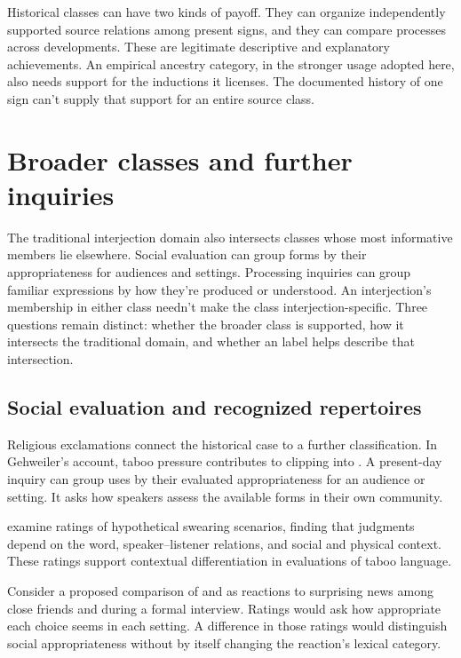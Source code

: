 \documentclass[12pt]{article}
\begin{document}
Historical classes can have two kinds of payoff. They can
organize independently supported source relations among present signs,
and they can compare processes across developments. These are legitimate
descriptive and explanatory achievements. An empirical ancestry category,
in the stronger usage adopted here, also needs support for the
inductions it licenses. The documented history of one sign can't supply
that support for an entire source class.

\section{Broader classes and further inquiries}\label{sec:extensions}

The traditional interjection domain also intersects classes whose most
informative members lie elsewhere. Social evaluation can group forms
by their appropriateness for audiences and settings. Processing inquiries
can group familiar expressions by how they're produced or understood.
An interjection's membership in either class needn't make the class
interjection-specific. Three questions remain distinct: whether the
broader class is supported, how it intersects the traditional domain,
and whether an  label helps describe that intersection.

\subsection{Social evaluation and recognized repertoires}

Religious exclamations connect the historical case to a further classification.
In Gehweiler's account, taboo pressure contributes to clipping 
into . A present-day inquiry can group uses by their
evaluated appropriateness for an audience or setting. It asks how
speakers assess the available forms in their own community.

\textcite{jayjanschewitz2008} examine ratings of hypothetical swearing scenarios,
finding that judgments depend on the word, speaker--listener relations,
and social and physical context. These ratings support contextual
differentiation in evaluations of taboo language.

Consider a proposed comparison of  and 
as reactions to surprising news among close friends and during a
formal interview. Ratings would ask how appropriate each choice seems
in each setting. A difference in those ratings would distinguish
social appropriateness without by itself changing the reaction's
lexical category.
\end{document}
